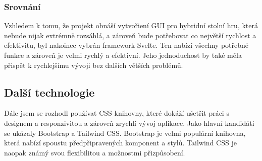 \subsubsection{Srovnání}
Vzhledem k tomu, že projekt obnáší vytvořiení GUI pro hybridní stolní hru, která nebude nijak extrémně rozsáhlá, a zároveň bude potřebovat co největší rychlost a efektivitu, byl nakoinec vybrán framework Svelte. Ten nabízí všechny potřebné funkce a zároveň je velmi rychlý a efektivní. Jeho jednoduchost by také měla přispět k rychlejšímu vývoji bez dalších větších problémů.

\subsection{Další technologie}
Dále jsem se rozhodl používat CSS knihovny, které dokáží ušetřit práci s designem a responzivitou a zároveň zrychlí vývoj aplikace. Jako hlavní kandidáti se ukázaly Bootstrap a Tailwind CSS. Bootstrap je velmi populární knihovna, která nabízí spoustu předpřipravených komponent a stylů. Tailwind CSS je naopak známý svou flexibilitou a možnostmi přizpůsobení.